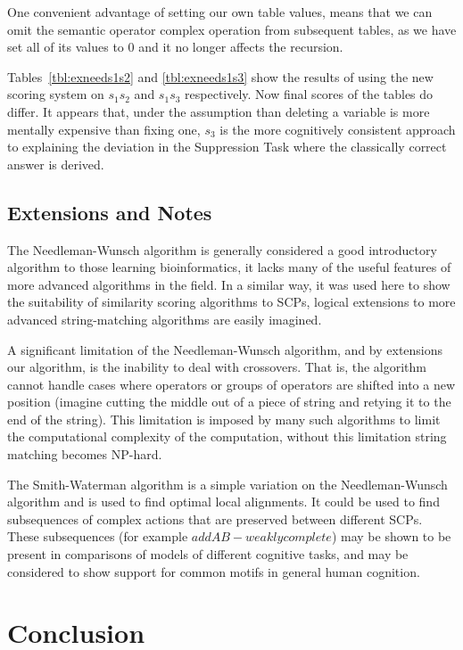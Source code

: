 \documentclass{article}
\begin{document}
One convenient advantage of setting our own table values, means that we can omit the semantic operator complex operation from subsequent tables, as we have set all of its values to 0 and it no longer affects the recursion.

Tables~\ref{tbl:exneeds1s2} and \ref{tbl:exneeds1s3} show the results of using the new scoring system on $s_1s_2$ and $s_1s_3$ respectively. Now final scores of the tables do differ. It appears that, under the assumption than deleting a variable is more mentally expensive than fixing one, $s_3$ is the more cognitively consistent approach to explaining the deviation in the Suppression Task where the classically correct answer is derived.

\subsection{Extensions and Notes}

The Needleman-Wunsch algorithm is generally considered a good introductory algorithm to those learning bioinformatics, it lacks many of the useful features of more advanced algorithms in the field. In a similar way, it was used here to show the suitability of similarity scoring algorithms to SCPs, logical extensions to more advanced string-matching algorithms are easily imagined.

A significant limitation of the Needleman-Wunsch algorithm, and by extensions our algorithm, is the inability to deal with crossovers. That is, the algorithm cannot handle cases where operators or groups of operators are shifted into a new position (imagine cutting the middle out of a piece of string and retying it to the end of the string). This limitation is imposed by many such algorithms to limit the computational complexity of the computation, without this limitation string matching becomes NP-hard.

The Smith-Waterman algorithm \citep{smith1981identification} is a simple variation on the Needleman-Wunsch algorithm and is used to  find optimal local alignments. It could be used to find subsequences of complex actions that are preserved between different SCPs. These subsequences (for example $addAB - weaklycomplete$) may be shown to be present in comparisons of models of different cognitive tasks, and may be considered to show support for common motifs in general human cognition.

\section{Conclusion} \label{sec:conc}
\end{document}
